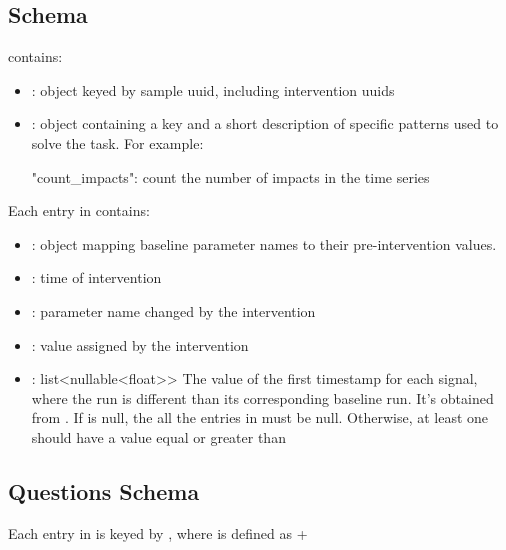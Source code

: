 \documentclass[11pt]{article}
\begin{document}
\subsection*{\texorpdfstring{}{ground_truth_information} Schema}

 contains:

\begin{itemize}
\item {}: object keyed by sample uuid, including intervention uuids
\item {}: object containing a key and a short description of specific patterns used to solve the task. For example:
\begin{DocCode}
  "count_impacts": count the number of impacts in the time series
\end{DocCode}
\end{itemize}

Each entry in  contains:

\begin{itemize}
\item {}: object mapping baseline parameter names to their pre-intervention values.
\item {}: time of intervention
\item {}: parameter name changed by the intervention
\item {}: value assigned by the intervention
\item {}: list<nullable<float>> The value of the first timestamp for each signal, where the run is different than its corresponding baseline run. 
It's obtained from . 
If  is null, the all the entries in  must be null. Otherwise, at least one should have a value equal or greater than 
\end{itemize}

\subsection*{Questions Schema}

Each entry in  is keyed by , where  is defined as  + 
\end{document}
